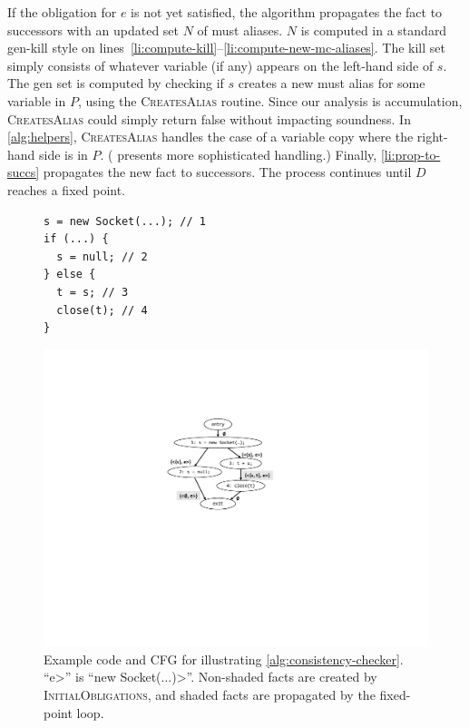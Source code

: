 If the obligation for $e$ is not yet satisfied, the algorithm propagates the
fact to successors with an updated set $N$ of must aliases.  $N$ is computed in
a standard gen-kill style on
lines~\ref{li:compute-kill}--\ref{li:compute-new-mc-aliases}.  The kill set
simply consists of whatever variable (if any) appears on the left-hand side of
$s$.  The gen set is computed by checking if $s$ creates a new must alias for
some variable in $P$, using the \textsc{CreatesAlias} routine.  Since our
analysis is accumulation, \textsc{CreatesAlias} could simply return false
without impacting soundness.  In \cref{alg:helpers}, \textsc{CreatesAlias}
handles the case of a variable copy where the right-hand side is in $P$.
( presents more sophisticated handling.) Finally,
\cref{li:prop-to-succs} propagates the new fact to successors.  The process
continues until $D$ reaches a fixed point.

\begin{figure}
  \begin{minipage}{0.4\columnwidth}
    \begin{lstlisting}
s = new Socket(...); // 1
if (...) {
  s = null; // 2
} else {
  t = s; // 3
  close(t); // 4
}
\end{lstlisting}
  \end{minipage}
  \begin{minipage}{0.55\columnwidth}
  \includegraphics[width=\linewidth,keepaspectratio]{cfg-example.pdf}
  \end{minipage}
  \prefigcaption
  \vspace{-5pt}
  \caption{Example code and CFG for illustrating \cref{alg:consistency-checker}.
    ``\<e>'' is ``\<new Socket(...)>''.
    Non-shaded facts are created by
    \textsc{InitialObligations}, and
    shaded facts are propagated by the fixed-point loop.
} \label{fig:cfg-example}
\end{figure}


